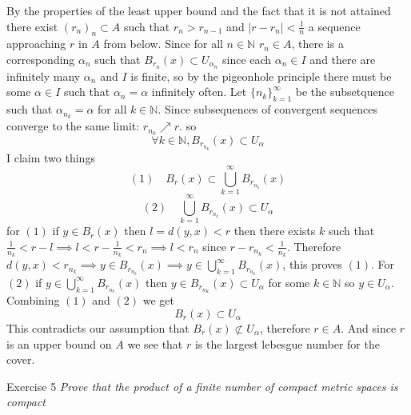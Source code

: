 \documentclass[11pt]{article}
\begin{document}
{\begin{enumerate}
            By the properties of the least upper bound and the fact that it is not attained there exist $(r_n)_n \subset A$ such that $r_n > r_{n-1}$ and  $|r-r_n| < \frac{1}{n}$ 
            a sequence approaching $r$ in  $A$ from below. Since for all $n \in \mathbb{N}$ $r_n \in A$, there is a corresponding $\alpha_n$ such that $B_{r_n}(x) \subset U_{\alpha_n}$ since each $\alpha_n \in I$
            and there are infinitely many $\alpha_n$ and $I$ is finite, so by the pigeonhole principle there must be some $\alpha \in I$ such that $\alpha_n = \alpha$ infinitely often. Let $\{n_k\}_{k=1}^{\infty}$ be the subsetquence such that $\alpha_{n_k} = \alpha$ for all $k \in \mathbb{N}$.
            Since subsequences of convergent sequences converge to the same limit: $r_{n_k} \nearrow r$. so
            \[
                \forall k \in \mathbb{N}, B_{r_{n_k}}(x) \subset U_\alpha
            \] 
            I claim two things
            \[
                (1) \quad B_r(x) \subset \bigcup_{k=1}^{\infty}B_{r_{n_k}}(x)
            \] 
            \[
                (2) \quad \bigcup_{k=1}^{\infty}B_{r_{n_k}}(x) \subset U_\alpha
            \] 
            for $(1)$ if  $y \in B_r(x)$ then $l = d(y,x) < r$ then there exists  $k$ such that  $\frac{1}{n_k} < r-l  \implies l < r - \frac{1}{n_k} < r_n \implies l < r_n $ since $r - r_{n_k} < \frac{1}{n_k}$.
            Therefore $d(y,x) < r_{n_k} \implies y \in B_{r_{n_k}}(x) \implies y \in \bigcup_{k=1}^{\infty}B_{r_{n_k}}(x)$, this proves $(1)$.
            For  $(2)$ if  $y \in \bigcup_{k=1}^{\infty}B_{r_{n_k}}(x)$ then $y \in B_{r_{n_K}}(x) \subset U_\alpha$ for some  $k \in \mathbb{N}$ so $y \in U_\alpha$.
            Combining $(1)$ and  $(2)$ we get
             \[
            B_r(x) \subset U_\alpha
            \] 
            This contradicts our assumption that $B_r(x) \not\subset U_\alpha$, therefore  $r \in A$.
            And since $r$ is an upper bound on  $A$ we see that  $r$ is the largest lebesgue number for the cover.
    \end{enumerate}
}
Exercise 5
\emph{
    Prove that the product of a finite number of compact metric spaces is compact
}
\end{document}
